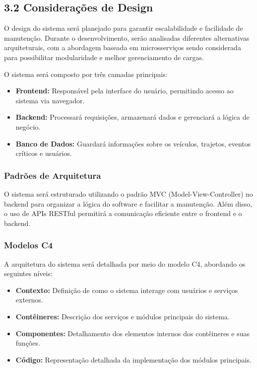 \documentclass[12pt]{article}
\begin{document}
\subsection*{3.2 Considerações de Design}

O design do sistema será planejado para garantir escalabilidade e facilidade de manutenção. Durante o desenvolvimento, serão analisadas diferentes alternativas arquiteturais, com a abordagem baseada em microsserviços sendo considerada para possibilitar modularidade e melhor gerenciamento de cargas.

O sistema será composto por três camadas principais:
\begin{itemize}
    \item \textbf{Frontend:} Responsável pela interface do usuário, permitindo acesso ao sistema via navegador.
    \item \textbf{Backend:} Processará requisições, armazenará dados e gerenciará a lógica de negócio.
    \item \textbf{Banco de Dados:} Guardará informações sobre os veículos, trajetos, eventos críticos e usuários.
\end{itemize}

\subsubsection*{Padrões de Arquitetura}
O sistema será estruturado utilizando o padrão MVC (Model-View-Controller) no backend para organizar a lógica do software e facilitar a manutenção. Além disso, o uso de APIs RESTful permitirá a comunicação eficiente entre o frontend e o backend.

\subsubsection*{Modelos C4}
A arquitetura do sistema será detalhada por meio do modelo C4, abordando os seguintes níveis:
\begin{itemize}
    \item \textbf{Contexto:} Definição de como o sistema interage com usuários e serviços externos.
    \item \textbf{Contêineres:} Descrição dos serviços e módulos principais do sistema.
    \item \textbf{Componentes:} Detalhamento dos elementos internos dos contêineres e suas funções.
    \item \textbf{Código:} Representação detalhada da implementação dos módulos principais.
\end{itemize}
\end{document}
